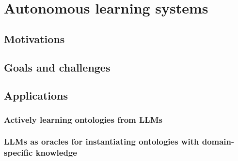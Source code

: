 
\chapter{Autonomous learning systems}
\label{ch:autonomous-learning-systems}

\section{Motivations}\label{sec:motivations}

\section{Goals and challenges}\label{sec:goals-and-challenges}

\section{Applications}\label{sec:applications}

\subsection{Actively learning ontologies from \acp{LLM}}\label{subsec:exact-learning-with-ac{llm}}

\subsection{\Aclp{LLM} as oracles for instantiating ontologies with domain-specific knowledge}\label{subsec:llm-as-oracles-for-instantiating-ontologies-with-domain-specific-knowledge}
